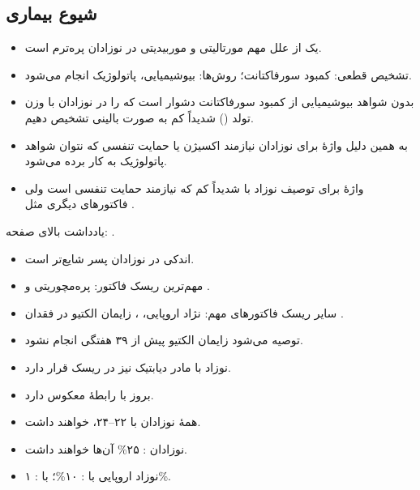 \documentclass[12pt,a4paper]{article}
\begin{document}
\subsection*{شیوع بیماری}
\begin{itemize}
\item یک از علل مهم مورتالیتی و موربیدیتی در نوزادان پره‌ترم است.
\item تشخیص قطعی: کمبود سورفاکتانت؛ روش‌ها: بیوشیمیایی، پاتولوژیک انجام می‌شود.
\item بدون شواهد بیوشیمیایی از کمبود سورفاکتانت دشوار است که  را در نوزادان با وزن تولد () شدیداً کم به صورت بالینی تشخیص دهیم.
\item به همین دلیل واژهٔ  برای نوزادان نیازمند اکسیژن یا حمایت تنفسی که نتوان شواهد پاتولوژیک  به کار برده می‌شود.
\item واژهٔ  برای توصیف نوزاد با  شدیداً کم که نیازمند حمایت تنفسی است ولی فاکتورهای دیگری مثل .
\end{itemize}

یادداشت بالای صفحه:  .
\begin{itemize}
\item {} اندکی در نوزادان پسر شایع‌تر است.
\item مهم‌ترین ریسک فاکتور: پره‌مچوریتی و .
\item سایر ریسک فاکتورهای مهم: نژاد اروپایی، ، زایمان الکتیو در فقدان .
\item توصیه می‌شود زایمان الکتیو پیش از ۳۹ هفتگی انجام نشود.
\item نوزاد با مادر دیابتیک نیز در ریسک  قرار دارد.
\item بروز  با  رابطهٔ معکوس دارد.
\item همهٔ نوزادان با  ۲۲–۲۴،  خواهند داشت.
\item نوزادان : ۲۵\% آن‌ها  خواهند داشت.
\item نوزاد اروپایی با : ۱۰\%؛ با : ۱\%.
\end{itemize}
\end{document}
